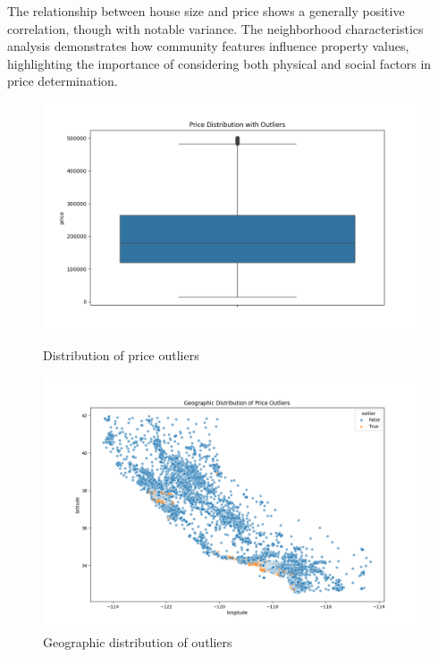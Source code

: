 \documentclass[a4paper, 11pt]{article}
\begin{document}
The relationship between house size and price shows a generally positive correlation, though with notable variance. The neighborhood characteristics analysis demonstrates how community features influence property values, highlighting the importance of considering both physical and social factors in price determination.

\begin{figure}[h]
    \centering
    \begin{minipage}{0.48\textwidth}
        \includegraphics[width=\linewidth]{figs/price_outliers.png}
        \caption{Distribution of price outliers}
        \label{fig:outliers_box}
    \end{minipage}
    \hfill
    \begin{minipage}{0.48\textwidth}
        \includegraphics[width=\linewidth]{figs/outliers_geographic.png}
        \caption{Geographic distribution of outliers}
        \label{fig:outliers_map}
    \end{minipage}
\end{figure}
\end{document}
